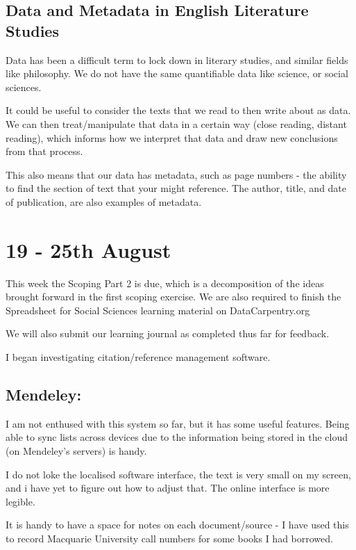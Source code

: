 \documentclass{article}
\begin{document}
\subsection{Data and Metadata in English Literature Studies}

Data has been a difficult term to lock down in literary studies, and similar fields like philosophy. We do not have the same quantifiable data like science, or social sciences. 

It could be useful to consider the texts that we read to then write about as data. We can then treat/manipulate that data in a certain way (close reading, distant reading), which informs how we interpret that data and draw new conclusions from that process. 

This also means that our data has metadata, such as page numbers - the ability to find the section of text that your might reference. The author, title, and date of publication, are also examples of metadata.

\section{19 - 25th August}

This week the Scoping Part 2 is due, which is a decomposition of the ideas brought forward in the first scoping exercise. 
We are also required to finish the Spreadsheet for Social Sciences learning material on DataCarpentry.org

We will also submit our learning journal as completed thus far for feedback. 

I began investigating citation/reference management software. 

\subsection{Mendeley:}

I am not enthused with this system so far, but it has some useful features. Being able to sync lists across devices due to the information being stored in the cloud (on Mendeley's servers) is handy. 

I do not loke the localised software interface, the text is very small on my screen, and i have yet to figure out how to adjust that. The online interface is more legible. 

It is handy to have a space for notes on each document/source - I have used this to record Macquarie University call numbers for some books I had borrowed. 
\end{document}
